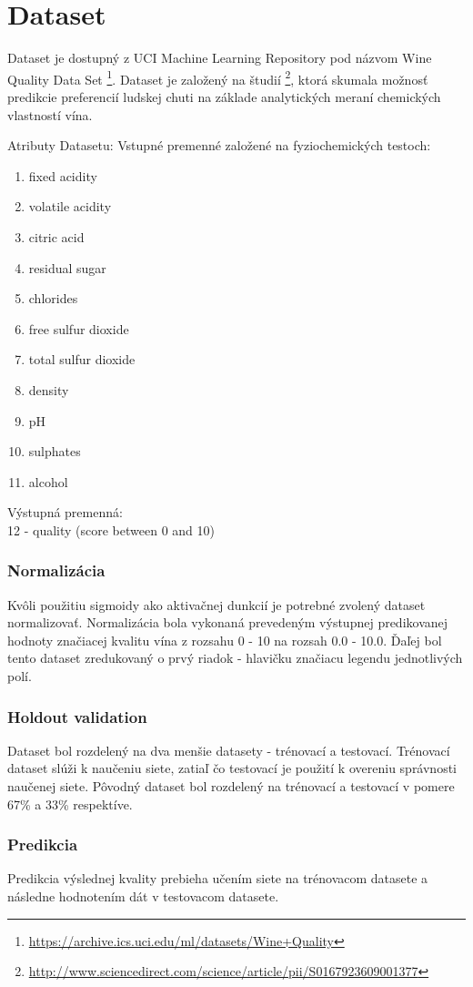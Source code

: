 \documentclass[a4paper, 11pt]{article}
\begin{document}
\section{Dataset}
Dataset je dostupný z UCI Machine Learning Repository pod názvom Wine Quality Data Set \footnote{\url{https://archive.ics.uci.edu/ml/datasets/Wine+Quality}}. Dataset je založený na študií \footnote{\url{http://www.sciencedirect.com/science/article/pii/S0167923609001377}}, ktorá skumala možnosť predikcie preferencií ludskej chuti na základe analytických meraní chemických vlastností vína.

Atributy Datasetu:
Vstupné premenné založené na fyziochemických testoch:
\begin{enumerate}
   \item fixed acidity
   \item volatile acidity
   \item citric acid
   \item residual sugar
   \item chlorides
   \item free sulfur dioxide
   \item total sulfur dioxide
   \item density
   \item pH
   \item sulphates
   \item alcohol
\end{enumerate}
Výstupná premenná:\\
   12 - quality (score between 0 and 10)

\subsubsection*{Normalizácia}
Kvôli použitiu sigmoidy ako aktivačnej dunkcií je potrebné zvolený dataset normalizovať. Normalizácia bola vykonaná prevedeným výstupnej predikovanej hodnoty značiacej kvalitu vína z rozsahu 0 \-- 10 na rozsah 0.0 \-- 10.0. Ďaľej bol tento dataset zredukovaný o prvý riadok - hlavičku značiacu legendu jednotlivých polí.
\subsubsection*{Holdout validation} 
Dataset bol rozdelený na dva menšie datasety - trénovací a testovací. Trénovací dataset slúži k naučeniu siete, zatiaľ čo testovací je použití k overeniu správnosti naučenej siete. Pôvodný dataset bol rozdelený na trénovací a testovací v pomere 67\% a 33\% respektíve.
\subsubsection*{Predikcia}
Predikcia výslednej kvality prebieha učením siete na trénovacom datasete a následne hodnotením dát v testovacom datasete.
\end{document}
